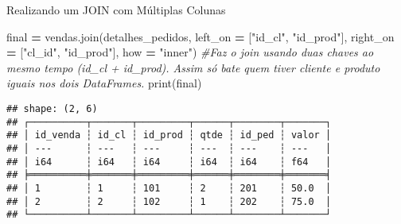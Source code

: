 \documentclass[
]{article}
\newenvironment{Shaded}{\begin{snugshade}}{\end{snugshade}}
\newcommand{\BuiltInTok}[1]{#1}
\newcommand{\CommentTok}[1]{\textcolor[rgb]{0.56,0.35,0.01}{\textit{#1}}}
\newcommand{\NormalTok}[1]{#1}
\newcommand{\OperatorTok}[1]{\textcolor[rgb]{0.81,0.36,0.00}{\textbf{#1}}}
\newcommand{\StringTok}[1]{\textcolor[rgb]{0.31,0.60,0.02}{#1}}
\begin{document}
Realizando um JOIN com Múltiplas Colunas

\begin{Shaded}
\begin{Highlighting}[]
\NormalTok{final }\OperatorTok{=}\NormalTok{ vendas.join(detalhes\_pedidos,}
\NormalTok{                    left\_on }\OperatorTok{=}\NormalTok{ [}\StringTok{"id\_cl"}\NormalTok{, }\StringTok{"id\_prod"}\NormalTok{],}
\NormalTok{                    right\_on }\OperatorTok{=}\NormalTok{ [}\StringTok{"cl\_id"}\NormalTok{, }\StringTok{"id\_prod"}\NormalTok{],}
\NormalTok{                    how }\OperatorTok{=} \StringTok{"inner"}\NormalTok{) }\CommentTok{\#Faz o join usando duas chaves ao mesmo tempo (id\_cl + id\_prod). Assim só bate quem tiver cliente e produto iguais nos dois DataFrames.}
\BuiltInTok{print}\NormalTok{(final)}
\end{Highlighting}
\end{Shaded}

\begin{verbatim}
## shape: (2, 6)
## ┌──────────┬───────┬─────────┬──────┬────────┬───────┐
## │ id_venda ┆ id_cl ┆ id_prod ┆ qtde ┆ id_ped ┆ valor │
## │ ---      ┆ ---   ┆ ---     ┆ ---  ┆ ---    ┆ ---   │
## │ i64      ┆ i64   ┆ i64     ┆ i64  ┆ i64    ┆ f64   │
## ╞══════════╪═══════╪═════════╪══════╪════════╪═══════╡
## │ 1        ┆ 1     ┆ 101     ┆ 2    ┆ 201    ┆ 50.0  │
## │ 2        ┆ 2     ┆ 102     ┆ 1    ┆ 202    ┆ 75.0  │
## └──────────┴───────┴─────────┴──────┴────────┴───────┘
\end{verbatim}
\end{document}
